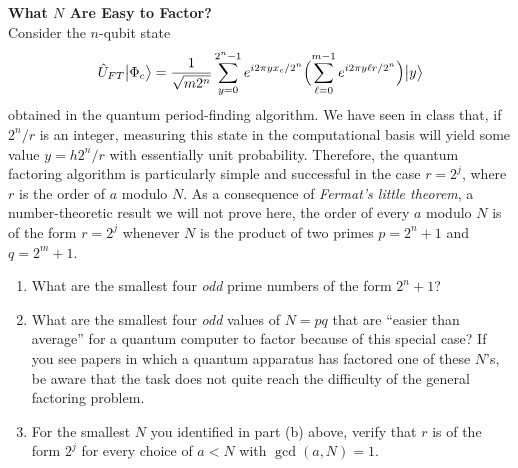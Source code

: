 \documentclass[12pt,letterpaper,boxed,cm]{hmcpset}
\newcommand{\ket}[1]{\big\lvert #1\big\rangle}
\begin{document}

\begin{problem}[1.]
    \textbf{What $N$ Are Easy to Factor?}\\
    Consider the $n$-qubit state 
    \[
        \hat{U}_{FT}\ket{\Phi_c} = \frac{1}{\sqrt{m2^n}} \sum_{y=0}^{2^n-1} e^{i2\pi yx_c/2^n} \Bigl(\sum_{\ell=0}^{m-1} e^{i2\pi y \ell r/2^n}\Bigr) \ket{y}
    \] 
    obtained in the quantum period-finding algorithm.  We have seen in class that, if $2^n/r$ is an integer, measuring this state in the computational basis will yield some value $y=h2^n/r$ with essentially unit probability.  Therefore, the quantum factoring algorithm is particularly simple and successful in the case $r=2^j$, where $r$ is the order of $a$ modulo $N$.  As a consequence of \textit{Fermat's little theorem}, a number-theoretic result we will not prove here, the order of every $a$ modulo $N$ is of the form $r=2^j$ whenever $N$ is the product of two primes $p=2^n+1$ and $q=2^m+1$.  
    \begin{enumerate}[label=(\alph*)]
        \item What are the smallest four \textit{odd} prime numbers of the form $2^n+1$?
        \item What are the smallest four \textit{odd} values of $N=pq$ that are ``easier than average'' for a quantum computer to factor because of this special case?  If you see papers in which a quantum apparatus has factored one of these $N$'s, be aware that the task does not quite reach the difficulty of the general factoring problem.
        \item For the smallest $N$ you identified in part (b) above, verify that $r$ is of the form $2^j$ for every choice of $a<N$ with $\gcd(a,N)=1$.
    \end{enumerate}
\end{problem}

\begin{solution}
    \vfill
\end{solution}
\newpage
\end{document}
